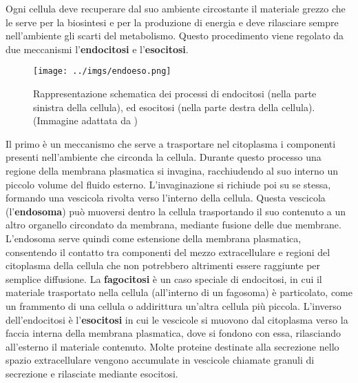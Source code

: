 Ogni cellula deve recuperare dal suo ambiente circostante il materiale grezzo che le serve per la biosintesi e per la produzione di energia e deve rilasciare sempre nell'ambiente gli scarti del metabolismo.
Questo procedimento viene regolato da due meccanismi l'\textbf{endocitosi} e l'\textbf{esocitosi}.

\begin{figure}[h]
\begin{center}
\texttt{[image: ../imgs/endoeso.png]}
\caption[Endocitosi ed Esocitosi]{Rappresentazione schematica dei processi di endocitosi (nella parte sinistra della cellula), ed esocitosi (nella parte destra della cellula).  (Immagine adattata da \cite{nelsonprincipi})}
\label{Fig:endoesocitosi}
\end{center}
\end{figure}

Il primo è un meccanismo che serve a trasportare nel citoplasma i componenti presenti nell'ambiente che circonda la cellula. Durante questo processo una regione della membrana plasmatica si invagina, racchiudendo al suo interno un piccolo volume del fluido esterno. L'invaginazione si richiude poi su se stessa, formando una vescicola rivolta verso l'interno della cellula.
Questa vescicola (l'\textbf{endosoma}) può muoversi dentro la cellula trasportando il suo contenuto a un altro organello circondato da membrana, mediante fusione delle due membrane. L'endosoma serve quindi come estensione della membrana plasmatica, consentendo il contatto tra componenti del mezzo extracellulare e regioni del citoplasma della cellula che non potrebbero altrimenti essere raggiunte per semplice diffusione. 
La \textbf{fagocitosi} è un caso speciale di endocitosi, in cui il materiale trasportato nella cellula (all'interno di un fagosoma) è particolato, come un frammento di una cellula o addirittura un'altra cellula più piccola.
L'inverso dell'endocitosi è l'\textbf{esocitosi} in cui le vescicole si muovono dal citoplasma verso la faccia interna della membrana plasmatica, dove si fondono con essa, rilasciando all'esterno il materiale contenuto. Molte proteine destinate alla secrezione nello spazio extracellulare vengono accumulate in vescicole chiamate granuli di secrezione e rilasciate mediante esocitosi.


